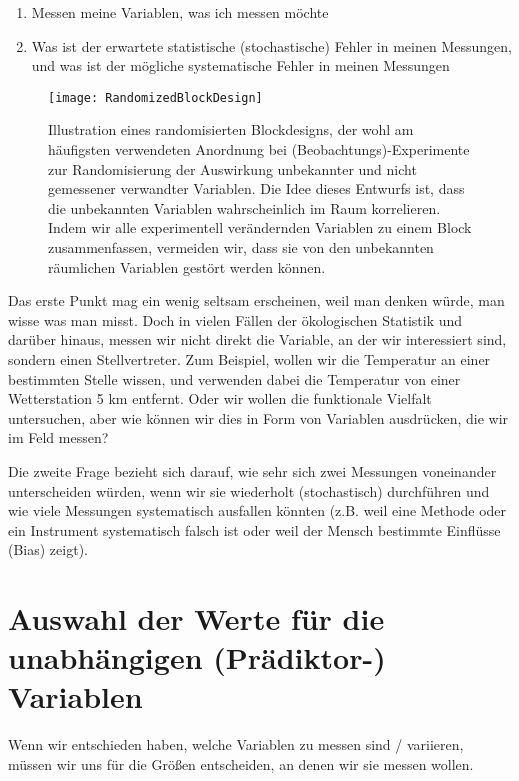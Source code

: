 \documentclass[a4paper,twoside]{tufte-book}\usepackage[]{graphicx}\usepackage[]{color}
\begin{document}
\begin{enumerate}
  \item Messen meine Variablen, was ich messen möchte
  \item Was ist der erwartete statistische (stochastische) Fehler in meinen Messungen, und was ist der mögliche systematische Fehler in meinen Messungen
\end{enumerate}

\begin{figure}[]
\begin{center}
\texttt{[image: RandomizedBlockDesign]}
\caption{Illustration eines randomisierten Blockdesigns, der wohl am häufigsten verwendeten Anordnung bei (Beobachtungs)-Experimente zur Randomisierung der Auswirkung unbekannter und nicht gemessener verwandter Variablen. Die Idee dieses Entwurfs ist, dass die unbekannten Variablen wahrscheinlich im Raum korrelieren. Indem wir alle experimentell verändernden Variablen zu einem Block zusammenfassen, vermeiden wir, dass sie von den unbekannten räumlichen Variablen gestört werden können.}
\label{fig: RandomizedBlockDesign}
\end{center}
\end{figure}


Das erste Punkt mag ein wenig seltsam erscheinen, weil man denken würde, man wisse was man misst. Doch in vielen Fällen der ökologischen Statistik und darüber hinaus, messen wir nicht direkt die Variable, an der wir interessiert sind, sondern einen Stellvertreter. Zum Beispiel, wollen wir die Temperatur an einer bestimmten Stelle wissen, und verwenden dabei die Temperatur von einer Wetterstation 5 km entfernt. Oder wir wollen die funktionale Vielfalt untersuchen, aber wie können wir dies in Form von Variablen ausdrücken, die wir im Feld messen?

Die zweite Frage bezieht sich darauf, wie sehr sich zwei Messungen voneinander unterscheiden würden, wenn wir sie wiederholt (stochastisch) durchführen und wie viele Messungen systematisch ausfallen könnten (z.B. weil eine Methode oder ein Instrument systematisch falsch ist oder weil der Mensch bestimmte Einflüsse (Bias) zeigt).


\section{Auswahl der Werte für die unabhängigen (Prädiktor-) Variablen}

Wenn wir entschieden haben, welche Variablen zu messen sind / variieren, müssen wir uns für die Größen entscheiden, an denen wir sie messen wollen.
\end{document}
